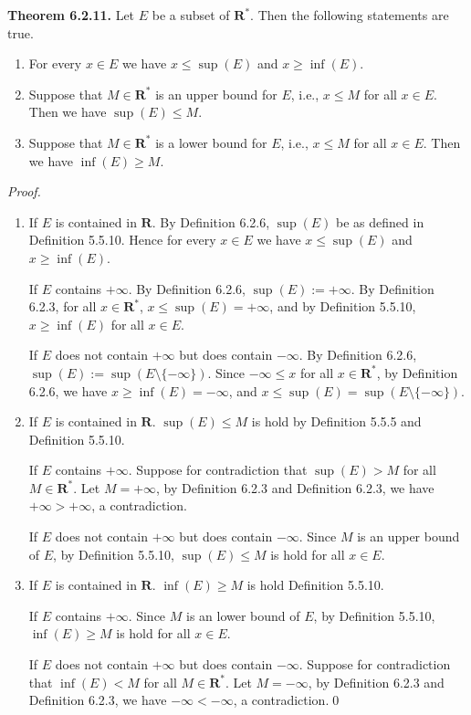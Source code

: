 \documentclass{book}
\newcommand{\pff}{\vspace{.25em}\noindent\emph{Proof.}~~}
\newcommand{\titl}[1]{\noindent\textbf{#1}}
\begin{document}
\begin{framed}
\titl{Theorem 6.2.11.} Let $E$ be a subset of $\mathbf{R}^*$. Then the following statements are true.
\begin{enumerate}
    \item For every $x\in E$ we have $x\leq\sup(E)$ and $x\geq\inf(E)$.
    \item Suppose that $M\in\mathbf{R}^*$ is an upper bound for $E$, i.e., $x\leq M$ for all $x\in E$. Then we have $\sup(E)\leq M$.
    \item Suppose that $M\in\mathbf{R}^*$ is a lower bound for $E$, i.e., $x\leq M$ for all $x\in E$. Then we have $\inf(E)\geq M$.
\end{enumerate}
\end{framed}
\pff
\begin{enumerate}
    \item If $E$ is contained in $\mathbf{R}$. By Definition 6.2.6, $\sup(E)$ be as defined in Definition 5.5.10. Hence for every $x\in E$ we have $x\leq\sup(E)$ and $x\geq\inf(E)$.
    
    If $E$ contains $+\infty$. By Definition 6.2.6, $\sup(E):=+\infty$. By Definition 6.2.3, for all $x\in\mathbf{R}^*$, $x\leq\sup(E)=+\infty$, and by Definition 5.5.10, $x\geq\inf(E)$ for all $x\in E$.

    If $E$ does not contain $+\infty$ but does contain $-\infty$. By Definition 6.2.6, $\sup(E):=\sup(E\setminus\{-\infty\})$. Since $-\infty\leq x$ for all $x\in\mathbf{R}^*$, by Definition 6.2.6, we have $x\geq\inf(E)=-\infty$, and $x\leq\sup(E)=\sup(E\setminus\{-\infty\})$.

    \item If $E$ is contained in $\mathbf{R}$. $\sup(E)\leq M$ is hold by Definition 5.5.5 and Definition 5.5.10.
    
    If $E$ contains $+\infty$. Suppose for contradiction that $\sup(E)>M$ for all $M\in\mathbf{R}^*$. Let $M=+\infty$, by Definition 6.2.3 and Definition 6.2.3, we have $+\infty>+\infty$, a contradiction.

    If $E$ does not contain $+\infty$ but does contain $-\infty$. Since $M$ is an upper bound of $E$, by Definition 5.5.10, $\sup(E)\leq M$ is hold for all $x\in E$.

    \item If $E$ is contained in $\mathbf{R}$. $\inf(E)\geq M$ is hold Definition 5.5.10.
    
    If $E$ contains $+\infty$. Since $M$ is an lower bound of $E$, by Definition 5.5.10, $\inf(E)\geq M$ is hold for all $x\in E$.

    If $E$ does not contain $+\infty$ but does contain $-\infty$. Suppose for contradiction that $\inf(E)<M$ for all $M\in\mathbf{R}^*$. Let $M=-\infty$, by Definition 6.2.3 and Definition 6.2.3, we have $-\infty<-\infty$, a contradiction.\qed
\end{enumerate}
\end{document}
